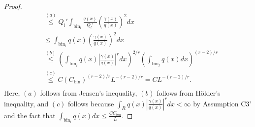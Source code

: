 \documentclass{article}
\newcommand{\bin}{\text{bin}}
\begin{document}
\begin{proof}
\begin{align*}
   &\stackrel{(a)} \leq Q_l' \int_{\bin_l} \frac{q(x)}{Q_l'} \left( \frac{\gamma(x)}{q(x)} \right)^2 dx\\
   &\leq \int_{\bin_l} q(x) \left( \frac{\gamma(x)}{q(x)} \right)^2 dx \\
   &\stackrel{(b)}\leq \left(\int_{\bin_l} q(x) \left| \frac{\gamma(x)}{q(x)} \right|^r dx \right)^{2/r}
         \left(\int_{\bin_l} q(x) dx \right)^{(r-2)/r} \\
   &\stackrel{(c)} \leq C (C_\bin)^{(r-2)/r} L^{-(r-2)/r} = C L^{-(r-2)/r}.\\
\end{align*}
Here, $(a)$ follows from Jensen's inequality, $(b)$ follows from H\"{o}lder's inequality, and $(c)$ follows because $\int_R q(x) \left| \frac{\gamma(x)}{q(x)} \right|^r dx < \infty$ by Assumption C3' and the fact that $\int_{\bin_l} q(x) dx \leq \frac{C C_{bin}}{L}$.  


\end{proof}
\end{document}
